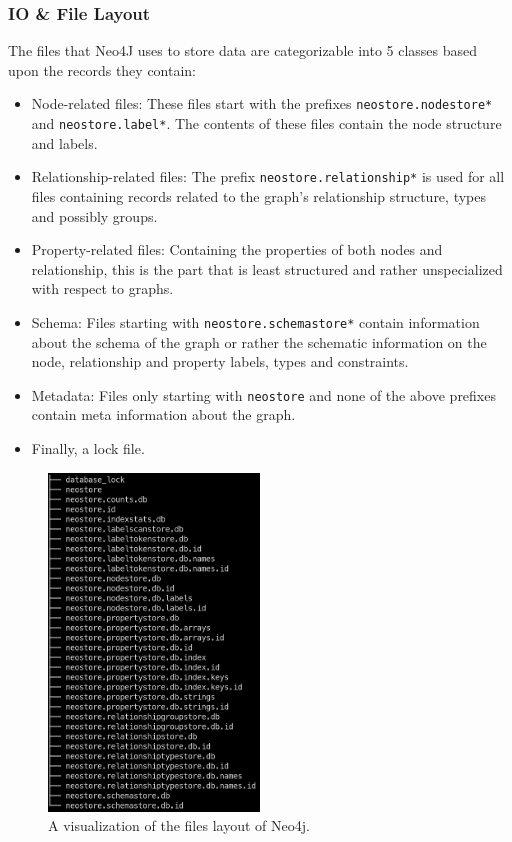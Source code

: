         \subsubsection{IO \& File Layout}\label{files_sec}
        The files that Neo4J uses to store data are categorizable into 5 classes based upon the records they contain:
        \begin{itemize}
            \item Node-related files: These files start with the prefixes \texttt{neostore.nodestore*} and \texttt{neostore.label*}. 
                The contents of these files contain the node structure and labels. 
            \item Relationship-related files: The prefix \texttt{neostore.relationship*} is used for all files containing records related to the graph's relationship structure, types and possibly groups.
            \item Property-related files: Containing the properties of both nodes and relationship, this is the part that is least structured and rather unspecialized with respect to graphs.
            \item Schema: Files starting with \texttt{neostore.schemastore*} contain information about the schema of the graph or rather the schematic information on the node, relationship and property labels, types and constraints.
            \item Metadata: Files only starting with \texttt{neostore} and none of the above prefixes contain meta information about the graph.
            \item Finally, a lock file.
        \end{itemize}
        
        \begin{figure}[htp]\label{files}
            \begin{center}
                \includegraphics[keepaspectratio,height=0.4\textheight,width=0.5\textwidth]{img/03_record/files.png}
            \end{center}
            \caption{A visualization of the files layout of Neo4j.} %
        \end{figure}

